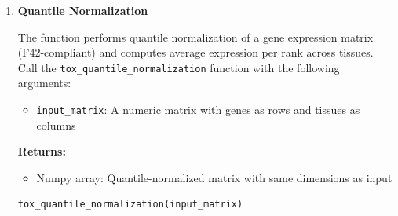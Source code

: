 \documentclass[11pt]{article}
\begin{document}
\begin{enumerate}
\begin{enumerate}
	      	      The function normalizes each gene's expression vector using \texttt{sqrt(mean(x\textasciicircum
	      	      	2))} across tissues (not classical standard deviation). Call the \texttt{tox\_normalize\_by\_std\_dev}
	      	      function with the following arguments:
	      	      
	      	      \begin{itemize}
	      	      	\item \texttt{input\_matrix}: A numeric matrix with genes as rows and
	      	      	      tissues as columns
	      	      \end{itemize}
	      	      
	      	      \textbf{Returns:}
	      	      \begin{itemize}
	      	      	\item Numpy array: Contains a normalized matrix with same dimensions
	      	      	      as input
	      	      \end{itemize}
	      	      \begin{lstlisting}[language=Python, caption={Python Standard Deviation Normalization}]
tox_normalize_by_std_dev(input_matrix)
	      	      \end{lstlisting}
	      	      
	      	\item \textbf{Quantile Normalization}
	      	      
	      	      The function performs quantile normalization of a gene expression matrix
	      	      (F42-compliant) and computes average expression per rank across tissues.
	      	      Call the \texttt{tox\_quantile\_normalization} function with the following
	      	      arguments:
	      	      
	      	      \begin{itemize}
	      	      	\item \texttt{input\_matrix}: A numeric matrix with genes as rows and
	      	      	      tissues as columns
	      	      \end{itemize}
	      	      
	      	      \textbf{Returns:}
	      	      \begin{itemize}
	      	      	\item Numpy array: Quantile-normalized matrix with same dimensions
	      	      	      as input
	      	      \end{itemize}
	      	      \begin{lstlisting}[language=Python, caption={Python Quantile Normalization}]
tox_quantile_normalization(input_matrix)
	      	      \end{lstlisting}
	      	      

\end{enumerate}
\end{enumerate}
\end{document}
